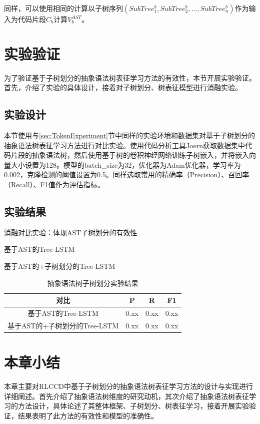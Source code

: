 同样，可以使用相同的计算以子树序列$\left(SubTree_{1}^{b},SubTree_{2}^{b},\ldots,SubTree_{n}^{b}\right)$作为输入为代码片段$C_{b}$计算$V_{b}^{AST}$。


\section{实验验证}
\label{sec:ASTExperiment}
为了验证基于子树划分的抽象语法树表征学习方法的有效性，本节开展实验验证。首先，介绍了实验的具体设计，接着对子树划分、树表征模型进行消融实验。

\subsection{实验设计}
\label{subsec:ASTDesign}

本节使用与\ref{sec:TokenExperiment}节中同样的实验环境和数据集对基于子树划分的抽象语法树表征学习方法进行对比实验。使用代码分析工具Joern获取数据集中代码片段的抽象语法树，然后使用基于树的卷积神经网络训练子树嵌入，并将嵌入向量大小设置为128。模型的batch\_size为32，优化器为Adam优化器，学习率为0.002，克隆检测的阈值设置为0.5。同样选取常用的精确率（Precision）、召回率（Recall）、F1值作为评估指标。

\subsection{实验结果}
\label{subsec:TokenResult}
消融对比实验：体现AST子树划分的有效性

基于AST的Tree-LSTM

基于AST的+子树划分的Tree-LSTM

\begin{table}
  \centering
  \caption{抽象语法树子树划分实验结果} %
  \begin{tabular*}{0.9\textwidth}{@{\extracolsep{\fill}}cccc}
  \toprule
    对比			&P		&R		&F1 \\
  \midrule
    基于AST的Tree-LSTM			&0.xx	&0.xx		&0.xx \\
    基于AST的+子树划分的Tree-LSTM			&0.xx		&0.xx		&0.xx \\
  \bottomrule
  \end{tabular*}
\end{table}

\section{本章小结}
\label{sec:Summary4}
本章主要对RLCCD中基于子树划分的抽象语法树表征学习方法的设计与实现进行详细阐述。首先介绍了抽象语法树维度的研究动机，其次介绍了抽象语法树表征学习的方法设计，具体论述了其整体框架、子树划分、树表征学习，接着开展实验验证，结果表明了此方法的有效性和模型的准确性。




